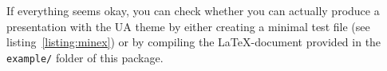 If everything seems okay, you can check whether you can actually produce a
presentation with the UA theme by either creating a minimal test file (see
listing~\ref{listing:minex}) or by compiling the \LaTeX-document provided in
the \lstinline!example/! folder of this package.


\begin{figure}
\centering
\setlength{\figurewidth}{6cm}


\end{figure}
